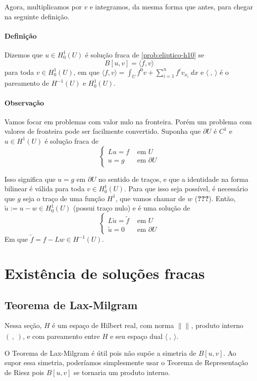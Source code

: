 \documentclass[a4paper, 11pt]{book}
\begin{document}
Agora, multiplicamos por $v$ e integramos, da mesma forma que antes, para chegar na seguinte definição.

\paragraph{Definição} Dizemos que $u \in H^1_0(U)$ é solução fraca de \eqref{prob:eliptico-h10} se \[
B[u,v] = \langle f,v \rangle	
\]
para toda $v \in H^1_0(U)$, em que $\langle f, v \rangle = \int_U f^0v + \sum_{i=1}^{n} f^i v_{x_i}\ dx $ e $\langle \ {,} \ \rangle$ é o pareamento de $H^{-1}(U)$ e $H^1_0(U)$.

\paragraph{Observação} Vamos focar em problemas com valor nulo na fronteira. Porém um problema com valores de fronteira pode ser facilmente convertido. Suponha que $\partial U$ é $C^1$ e $u\in H^1(U)$ é solução fraca de \[
\begin{cases}
	Lu=f &\text{ em }U\\
	u=g &\text{ em }\partial U
\end{cases}	
\]

Isso significa que $u=g \text{ em } \partial U$ no sentido de traços, e que a identidade na forma bilinear é válida para toda $v \in H^1_0(U)$. Para que isso seja possível, é necessário que $g$ seja o traço de uma função $H^1$, que vamos chamar de $w$ (\textbf{???}). Então, $\tilde{u} := u - w \in H^1_0(U)$ (possui traço nulo) e é uma solução de 
\[
\begin{cases}
	L\tilde{u} = \tilde{f} &\text{ em } U \\
	\tilde{u} = 0 &\text{ em } \partial U
\end{cases}	
\]
Em que $\tilde{f} = f - Lw \in H^{-1}(U)$.

\section{Existência de soluções fracas}
\subsection{Teorema de Lax-Milgram}

Nessa seção, $H$ é um espaço de Hilbert real, com norma $\|\|_{}$, produto interno $(\ {,} \ )$, e com pareamento entre $H$ e seu espaço dual $\langle \ {,} \ \rangle$.

O Teorema de Lax-Milgram é útil pois não supõe a simetria de $B[u,v]$. Ao supor essa simetria, poderíamos simplesmente usar o Teorema de Representação de Riesz pois $B[u,v]$ se tornaria um produto interno. 
\end{document}
